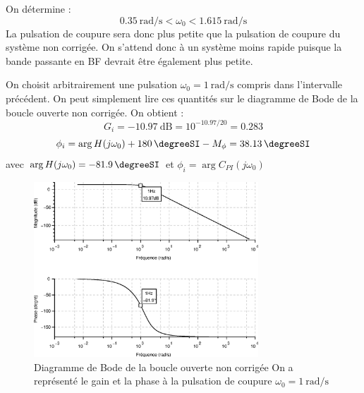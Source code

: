On détermine :
\[
    \SI{0.35}{\radian\per\second}<\omega_0<\SI{1.615}{\radian\per\second}
\]
La pulsation de coupure sera donc plus petite que la pulsation de coupure
du système non corrigée. On s'attend donc à un système moins rapide puisque la 
bande passante en BF devrait être également plus petite.

On choisit arbitrairement une pulsation $\omega_0=\SI{1}{\radian\per\second}$
compris dans l'intervalle précédent.
On peut simplement lire ces quantités sur le diagramme de Bode de la boucle
ouverte non corrigée. On obtient :
\[
    G_i=\SI{-10.97}{\dB}=10^{-10.97/20}=0.283
\]
\[
    \phi_i=\arg{H(j\omega_0)}+\SI{180}{\degreeSI}-M_\phi=\SI{38.13}{\degreeSI}
\]
avec $\arg{H(j\omega_0)}=\SI{-81.9}{\degreeSI}$ et 
$\phi_i=\arg{C_{PI}(j\omega_0)}$
\begin{figure}
    \centering
    \includegraphics[width=0.75\textwidth]{fig/chap_correction/bode_BONC_4.eps}
    \caption{Diagramme de Bode de la boucle ouverte non corrigée
             On a représenté le gain et la phase à la pulsation de coupure 
             $\omega_0=\SI{1}{\radian\per\second}$}
\end{figure}
